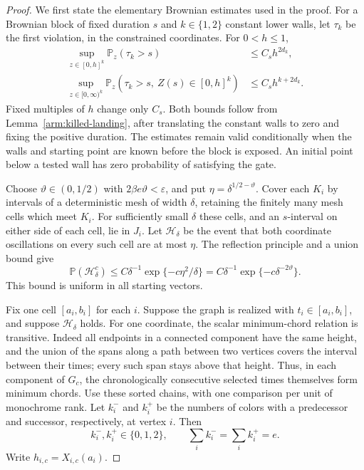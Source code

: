 \begin{proof}
We first state the elementary Brownian estimates used in the proof.
For a Brownian block of fixed duration $s$ and $k\in\{1,2\}$ constant
lower walls, let $\tau_k$ be the first violation, in the constrained
coordinates.  For $0<h\le1$,
\begin{align}
 \sup_{z\in[0,h]^k}\mathbb P_z(\tau_k>s)
       &\le C_s h^{2d_k},\label{arm:finite-diagram-survival}\\
 \sup_{z\in[0,\infty)^k}
 \mathbb P_z(\tau_k>s,\ Z(s)\in[0,h]^k)
       &\le C_s h^{k+2d_k}.\label{arm:finite-diagram-landing}
\end{align}
Fixed multiples of $h$ change only $C_s$.
Both bounds follow from Lemma~\ref{arm:killed-landing}, after translating
the constant walls to zero and fixing the positive duration.
The estimates remain valid conditionally when the walls and starting
point are known before the block is exposed.  An initial point below
a tested wall has zero probability of satisfying the gate.

Choose $\vartheta\in(0,1/2)$ with $2\beta e\vartheta<\varepsilon$, and put
$\eta=\delta^{1/2-\vartheta}$.  Cover each $K_i$ by intervals of a
deterministic mesh of width $\delta$, retaining the finitely many mesh
cells which meet $K_i$.  For sufficiently small $\delta$ these cells,
and an $s$-interval on either side of each cell, lie in $J_i$.
Let $\mathcal H_\delta$ be the event that both coordinate oscillations
on every such cell are at most $\eta$.  The reflection principle and
a union bound give
\begin{equation}
\label{arm:finite-diagram-mesh-error}
 \mathbb P(\mathcal H_\delta^c)
 \le C\delta^{-1}\exp\{-c\eta^2/\delta\}
 =C\delta^{-1}\exp\{-c\delta^{-2\vartheta}\}.
\end{equation}
This bound is uniform in all starting vectors.

Fix one cell $[a_i,b_i]$ for each $i$.  Suppose the graph is realized
with $t_i\in[a_i,b_i]$, and suppose $\mathcal H_\delta$ holds.
For one coordinate, the scalar minimum-chord relation is transitive.
Indeed all endpoints in a connected component have the same height,
and the union of the spans along a path between two vertices covers
the interval between their times; every such span stays above that
height.  Thus, in each component of $G_c$, the chronologically
consecutive selected times themselves form minimum chords.  Use
these sorted chains, with one comparison per unit of monochrome rank.
Let $k_i^-$ and $k_i^+$ be the numbers of colors with a predecessor
and successor, respectively, at vertex $i$.  Then
\begin{equation}
\label{arm:finite-diagram-incidences}
 k_i^-,k_i^+\in\{0,1,2\},\qquad
 \sum_i k_i^- =\sum_i k_i^+=e.
\end{equation}
Write $h_{i,c}=X_{i,c}(a_i)$.


\end{proof}
